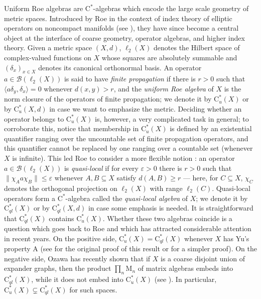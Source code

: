\documentclass[11pt]{amsart}
\newcommand{\cstu}{\mathrm{C}^*_u}
\newcommand{\cstql}{\mathrm{C}^*_{\textit{ql}}}
\numberwithin{equation}{section}
\theoremstyle{definition}
\theoremstyle{remark}
\begin{document}
Uniform Roe algebras are $\mathrm{C}^*$-algebras which encode the large scale
geometry of metric spaces. Introduced by Roe in the context of index theory
of elliptic operators on noncompact manifolds (see \cite{Roe1988,Roe1993}), they have since
become a central object at the interface of coarse geometry, operator algebras,
and higher index theory.  Given a  metric space
$(X,d)$, $\ell_2(X)$ denotes the Hilbert space of complex-valued functions on $X$ whose squares are absolutely summable and $(\delta_x)_{x\in X}$ denotes its canonical orthonormal basis. An operator $a\in\mathcal{B}(\ell_2(X))$ is said to have
\emph{finite propagation} if there is $r>0$ such that
$\langle a\delta_y,\delta_x\rangle=0$ whenever $d(x,y)>r$, and the
\emph{uniform Roe algebra} of $X$  is the norm
closure of the operators of finite propagation; we denote it by     $\cstu(X)$ or by $\cstu(X,d)$ in case we want to emphasize the metric. Deciding whether an operator belongs to  $\cstu(X)$ is, however, a very complicated task in general; to corroborate this, notice that membership in $\cstu(X)$  is defined by
an existential quantifier ranging over the uncountable set of finite propagation operators, and
this quantifier cannot be replaced by one ranging over a countable set (whenever $X$ is infinite).  This led Roe to consider a more flexible
notion \cite{Roe1988}: an operator $a\in \mathcal{B}(\ell_2(X))$ is
\emph{quasi-local} if for every $\varepsilon>0$ there is $r>0$ such that
$\|\chi_A a\chi_B\|\le \varepsilon$ whenever $A,B\subseteq X$ satisfy
$d(A,B)\ge r$ --- here, for $C\subseteq X$,  $\chi_C$  denotes the orthogonal projection on $\ell_2(X)$ with range $\ell_2(C)$. Quasi-local operators form a $\mathrm{C}^*$-algebra called  the
\emph{quasi-local algebra} of $X$; we denote it by $\mathrm{C}^*_{ql}(X)$ or by $\mathrm{C}^*_{ql}(X,d)$ in case some emphasis is needed. It is straightforward that  $\cstql(X)$ contains
$\mathrm{C}^*_u(X)$. Whether these two algebras coincide is a question which
goes back to Roe and which has attracted considerable attention in recent years.
On the positive side, $\mathrm{C}^*_u(X)=\mathrm{C}^*_{ql}(X)$ whenever $X$ has
Yu's property A (see \cite[Theorem 3.3]{SpakulaZhang2020JFA} for the original proof of this result or \cite[Theorem 5]{Ozawa2023} for a simpler proof). On the negative
side, Ozawa has recently shown that if $X$ is a coarse disjoint union of
expander graphs, then the product $\prod_n \mathrm{M}_n$ of matrix algebras embeds
into $\mathrm{C}^*_{ql}(X)$, while it does not embed into $\mathrm{C}^*_u(X)$
(see \cite[Theorems A and B]{Ozawa2023}). In particular, $\mathrm{C}^*_u(X)\subsetneq \mathrm{C}^*_{ql}(X)$
for such spaces.
\end{document}
